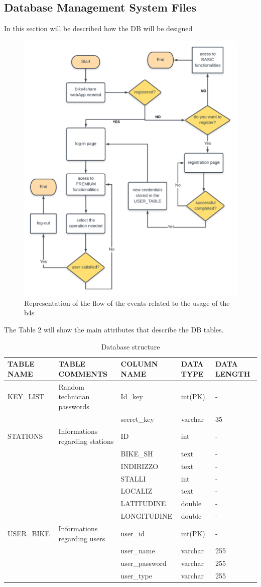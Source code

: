 \documentclass{article}
\begin{document}
\subsection{Database Management System Files}
In this section will be described how the DB will be designed 

\begin{figure}[h]
    \centering
    \includegraphics[width=0.55\linewidth]{image/flow_chart.png}
    \caption{Representation of the flow of the events related to the usage of the b4s}
    \label{fig:flow}
\end{figure}

The Table 2 will show the main attributes that describe the DB tables.

\begin{table} [H]
\begin{tabular}{|l|p{}|l|p{}|p{}|}
 \hline TABLE NAME &   TABLE COMMENTS &    COLUMN NAME & DATA TYPE & DATA LENGTH    \\
 \hline
 KEY\_LIST &  Random technician passwords & Id\_key &int(PK)& -\\
  & &  secret\_key & varchar & 35\\
 \hline
 STATIONS  &   Informations regarding stations & ID &int & -\\
  & &  BIKE\_SH & text & - \\
  & & INDIRIZZO & text & - \\
  & & STALLI & int & - \\
  & & LOCALIZ & text & - \\
  & & LATITUDINE & double & - \\
  & & LONGITUDINE & double & - \\
 \hline
 USER\_BIKE &  Informations regarding users & user\_id & int(PK)& -\\
 & & user\_name & varchar & 255 \\
 & & user\_password & varchar & 255 \\
 & & user\_type & varchar & 255\\
 \hline
\end{tabular}
\label{tab:attributes}
\caption{Database structure}
\end{table}
\end{document}
